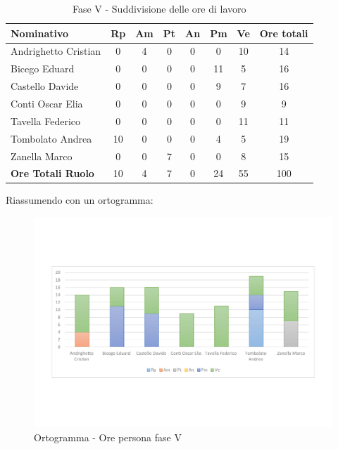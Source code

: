 \documentclass[../PianoProgetto.tex]{subfiles}
\begin{document}
	\begin{table}[h]
		\begin{tabularx}{\textwidth}{l  * {6}{C}  c}
			\toprule
			\textbf{Nominativo} & \textbf{Rp} & \textbf{Am} & \textbf{Pt} 
						& \textbf{An} & \textbf{Pm} & \textbf{Ve} & \textbf{Ore totali} \\
			\midrule
			Andrighetto Cristian & 0 & 4 & 0 & 0 & 0 & 10 & 14 \\
			Bicego Eduard & 0 & 0 &	0 &	0 &	11 & 5 & 16 \\
			Castello Davide & 0 & 0 & 0 & 0 & 9 & 7 & 16 \\
			Conti Oscar Elia &0 & 0 & 0 & 0 & 0 & 9 & 9 \\
			Tavella Federico &	0 & 0 & 0 & 0 & 0 & 11 & 11 \\
			Tombolato Andrea & 10 & 0 & 0 & 0 & 4 & 5 & 19 \\
			Zanella Marco & 0 & 0 & 7 & 0 & 0 & 8 & 15 \\
			\midrule			
			\textbf{Ore Totali Ruolo} & 10 & 4 &	7 &	0 &	24 & 55 & 100 \\
			\bottomrule
		\end{tabularx}
		\caption{Fase V - Suddivisione delle ore di lavoro}
		\label{tab:faseV_ore}
	\end{table}
\vfill	
	Riassumendo con un ortogramma:
	
	\begin{figure}[!h]
		\centering
		\includegraphics[width=\textwidth , trim=2cm 5cm 2cm 5cm]{grafici/V/V-ore-persona}
			\caption{Ortogramma - Ore persona fase V}
		\label{fig:BarChart-faseV_ore}
	\end{figure}
\vfill	
\newpage
\vfill
\end{document}
